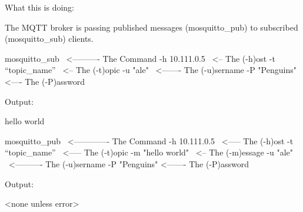 \begin{frame}
	{What this is doing:}

	The MQTT broker is passing published messages (mosquitto\_pub) to
	subscribed (mosquitto\_sub) clients.

	\begin{multicols}{2}
		\begin{raw}[fontsize=\small]
mosquitto_sub \ <---------- The Command
	-h 10.111.0.5 \ <-- The (-h)ost
	-t “topic_name” \ <-- The (-t)opic
	-u "ale" \ <------- The (-u)sername 
	-P "Penguins" <---- The (-P)assword
		\end{raw}
		Output:
		\begin{raw}[fontsize=\small]
hello world
\end{raw}


		\vfill\null
		\columnbreak

		\begin{raw}[fontsize=\small]
mosquitto_pub \ <------------- The Command
	-h 10.111.0.5 \ <----- The (-h)ost
	-t “topic_name” \ <----- The (-t)opic
	-m "hello world" \ <-- The (-m)essage
	-u "ale" \ <---------- The (-u)sername
	-P "Penguins" <------- The (-P)assword
\end{raw}
		Output:
		\begin{raw}[fontsize=\small]
<none unless error>
\end{raw}

	\end{multicols}

\end{frame}

\cprotect\note{
}

